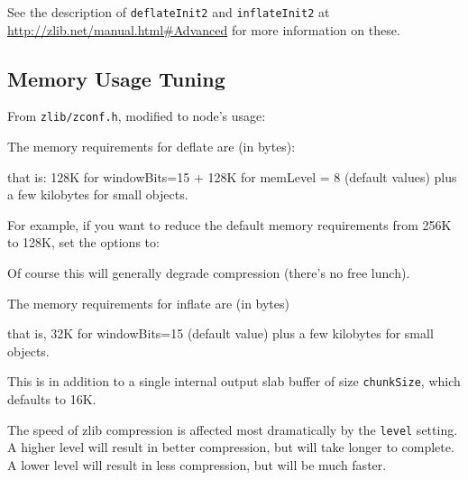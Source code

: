 See the description of \texttt{deflateInit2} and \texttt{inflateInit2}
at \url{http://zlib.net/manual.html\#Advanced} for more information on
these.

\subsection{Memory Usage Tuning}\label{memory-usage-tuning}

From \texttt{zlib/zconf.h}, modified to node's usage:

The memory requirements for deflate are (in bytes):

\begin{Shaded}
\begin{Highlighting}[]
\NormalTok{(} \NormalTok{)) +  (} \NormalTok{))}
\end{Highlighting}
\end{Shaded}

that is: 128K for windowBits=15 + 128K for memLevel = 8 (default values)
plus a few kilobytes for small objects.

For example, if you want to reduce the default memory requirements from
256K to 128K, set the options to:

\begin{Shaded}
\begin{Highlighting}[]
\NormalTok{\{ }\NormalTok{: }\NormalTok{, }\NormalTok{: } \NormalTok{\}}
\end{Highlighting}
\end{Shaded}

Of course this will generally degrade compression (there's no free
lunch).

The memory requirements for inflate are (in bytes)

\begin{Shaded}
\begin{Highlighting}[]
 
\end{Highlighting}
\end{Shaded}

that is, 32K for windowBits=15 (default value) plus a few kilobytes for
small objects.

This is in addition to a single internal output slab buffer of size
\texttt{chunkSize}, which defaults to 16K.

The speed of zlib compression is affected most dramatically by the
\texttt{level} setting. A higher level will result in better
compression, but will take longer to complete. A lower level will result
in less compression, but will be much faster.

